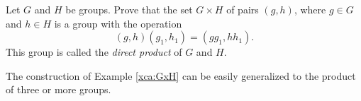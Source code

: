 \begin{exercise}
\label{xca:GxH}
        Let $G$ and $H$ be groups. Prove that 
        the set 
        $G\times H$
        of pairs $(g,h)$, where $g\in G$ and 
        $h\in H$ is a group with
        the operation
        \[
                (g,h)(g_1,h_1)=(gg_1,hh_1).
        \]
        This group is called the 
        \emph{direct product} of $G$ and $H$.
\end{exercise}

The construction of Example \ref{xca:GxH}
can be easily generalized to the product of 
three or more groups. 


